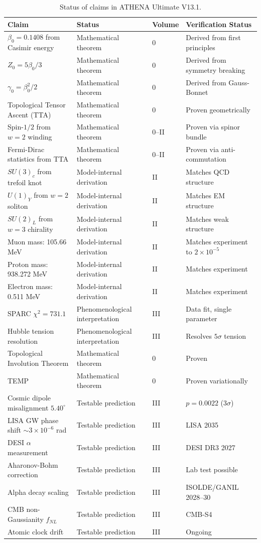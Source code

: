 \documentclass[12pt,oneside]{book}
\begin{document}
\begin{table}[H]
\centering
\renewcommand{\arraystretch}{1.3}
\begin{tabular}{|p{4.0cm}|p{3.0cm}|p{2.5cm}|p{3.5cm}|}
\hline
\textbf{Claim} & \textbf{Status} & \textbf{Volume} & \textbf{Verification Status} \\
\hline
$\beta_0 = 0.1408$ from Casimir energy & Mathematical theorem & 0 & Derived from first principles \\
$Z_0 = 5\beta_0/3$ & Mathematical theorem & 0 & Derived from symmetry breaking \\
$\gamma_0 = \beta_0^2/2$ & Mathematical theorem & 0 & Derived from Gauss-Bonnet \\
Topological Tensor Ascent (TTA) & Mathematical theorem & 0 & Proven geometrically \\
Spin-$1/2$ from $w=2$ winding & Mathematical theorem & 0--II & Proven via spinor bundle \\
Fermi-Dirac statistics from TTA & Mathematical theorem & 0--II & Proven via anti-commutation \\
$SU(3)_c$ from trefoil knot & Model-internal derivation & II & Matches QCD structure \\
$U(1)_Y$ from $w=2$ soliton & Model-internal derivation & II & Matches EM structure \\
$SU(2)_L$ from $w=3$ chirality & Model-internal derivation & II & Matches weak structure \\
Muon mass: 105.66 MeV & Model-internal derivation & II & Matches experiment to $2\times10^{-5}$ \\
Proton mass: 938.272 MeV & Model-internal derivation & II & Matches experiment \\
Electron mass: 0.511 MeV & Model-internal derivation & II & Matches experiment \\
SPARC $\chi^2 = 731.1$ & Phenomenological interpretation & III & Data fit, single parameter \\
Hubble tension resolution & Phenomenological interpretation & III & Resolves $5\sigma$ tension \\
Topological Involution Theorem & Mathematical theorem & 0 & Proven \\
TEMP & Mathematical theorem & 0 & Proven variationally \\
Cosmic dipole misalignment $5.40^\circ$ & Testable prediction & III & $p=0.0022$ (3$\sigma$) \\
LISA GW phase shift $\sim 3\times10^{-6}$ rad & Testable prediction & III & LISA 2035 \\
DESI $\alpha$ measurement & Testable prediction & III & DESI DR3 2027 \\
Aharonov-Bohm correction & Testable prediction & III & Lab test possible \\
Alpha decay scaling & Testable prediction & III & ISOLDE/GANIL 2028--30 \\
CMB non-Gaussianity $f_{NL}$ & Testable prediction & III & CMB-S4 \\
Atomic clock drift & Testable prediction & III & Ongoing \\
\hline
\end{tabular}
\caption{Status of claims in ATHENA Ultimate V13.1.}
\end{table}
\end{document}
